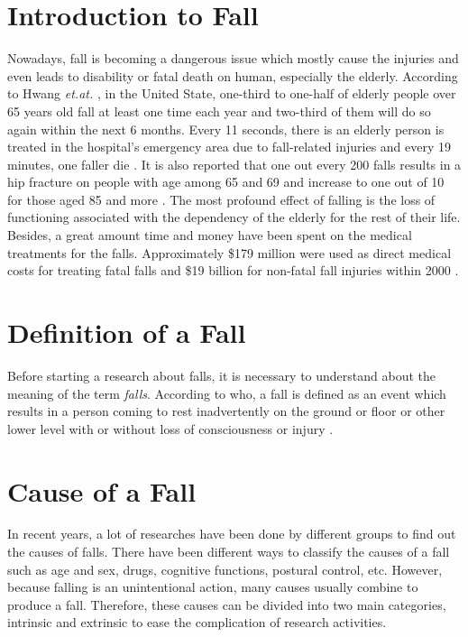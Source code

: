 \documentclass[letterpaper,12pt,titlepage,oneside,final]{book}
\begin{document}
\section{Introduction to Fall}
Nowadays, fall is becoming a dangerous issue which mostly cause the injuries and even leads to disability or fatal death on human, especially the elderly. According to Hwang \textit{et.at.} \cite{static1}, in the United State, one-third to one-half of elderly people over 65 years old fall at least one time each year  and two-third of them will do so again within the next 6 months. Every 11 seconds, there is an elderly person is treated in the hospital's emergency area due to fall-related injuries and every 19 minutes, one faller die \cite{fall_die}. It is also reported that one out every 200 falls results in a hip fracture on people with age among 65 and 69 and increase to one out of 10 for those aged 85 and more \cite{hip_fracture}. The most profound effect of falling is the loss of functioning associated with the dependency of the elderly for the rest of their life. Besides, a great amount time and money have been spent on the medical treatments for the falls. Approximately \$179 million were used as direct medical costs for treating fatal falls and \$19 billion for non-fatal fall injuries within 2000 \cite{cost_fatal}.

\section{Definition of a Fall}
Before starting a research about falls, it is necessary to understand about the meaning of the term \textit{falls}. According to \gls{who}, a fall is defined as an event which results in a person coming to rest inadvertently on the ground or floor or other lower level with or without loss of consciousness or injury \cite{who}. 

\section{Cause of a Fall}
In recent years, a lot of researches have been done by different groups to find out the causes of falls. There have been different ways to classify the causes of a fall such as age and sex, drugs, cognitive functions, postural control, etc. However, because falling is an unintentional action, many causes usually combine to produce a fall. Therefore, these causes can be divided into two main categories, intrinsic and extrinsic to ease the complication of research activities.
\end{document}
